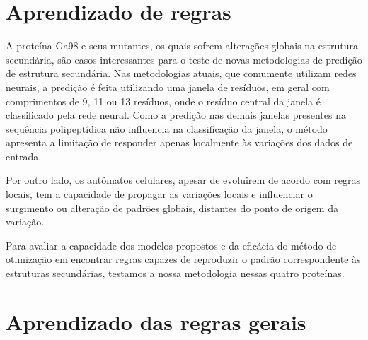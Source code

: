 \chapter{Aprendizado de regras}

A proteína Ga98 e seus mutantes, os quais sofrem alterações globais na estrutura secundária, são casos interessantes para o teste de novas metodologias de predição de estrutura secundária. Nas metodologias atuais, que comumente utilizam redes neurais, a predição é feita utilizando uma janela de resíduos, em geral com comprimentos de 9, 11 ou 13 resíduos, onde o resíduo central da janela é classificado pela rede neural. Como a predição nas demais janelas presentes na sequência polipeptídica não influencia na classificação da janela, o método apresenta a limitação de responder apenas localmente às variações dos dados de entrada.  

Por outro lado, os autômatos celulares, apesar de evoluirem de acordo com regras locais, tem a capacidade de propagar as variações locais e influenciar o surgimento ou alteração de padrões globais, distantes do ponto de origem da variação. 

Para avaliar a capacidade dos modelos propostos e da eficácia do método de otimização em encontrar regras capazes de reproduzir o padrão correspondente às estruturas secundárias, testamos a nossa metodologia nessas quatro proteínas.



\chapter{Aprendizado das regras gerais}